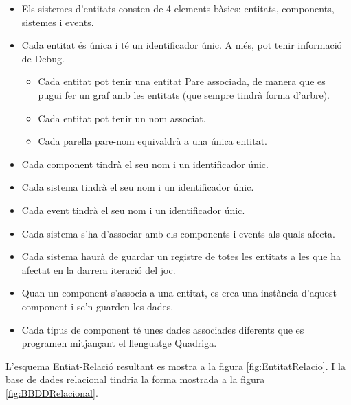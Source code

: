   \begin{itemize}
    \item Els sistemes d'entitats consten de 4 elements bàsics: entitats, components, sistemes i events.
    
    \item Cada entitat és única i té un identificador únic. A més, pot tenir informació de Debug.
      \begin{itemize}
        \item Cada entitat pot tenir una entitat Pare associada, de manera que es pugui fer un graf amb les entitats (que sempre tindrà forma d'arbre).
        \item Cada entitat pot tenir un nom associat.
        \item Cada parella pare-nom equivaldrà a una única entitat.
      \end{itemize}
    \item Cada component tindrà el seu nom i un identificador únic.
    
    \item Cada sistema tindrà el seu nom i un identificador únic.
    
    \item Cada event tindrà el seu nom i un identificador únic.
    
    \item Cada sistema s'ha d'associar amb els components i events als quals afecta.
    
    \item Cada sistema haurà de guardar un registre de totes les entitats a les que ha afectat en la darrera iteració del joc.
    
    \item Quan un component s'associa a una entitat, es crea una instància d'aquest component i se'n guarden les dades.
    
    \item Cada tipus de component té unes dades associades diferents que es programen mitjançant el llenguatge Quadriga.
  \end{itemize}

  L'esquema Entiat-Relació resultant es mostra a la figura \ref{fig:EntitatRelacio}. I la base de dades relacional tindria la forma mostrada a la figura \ref{fig:BBDDRelacional}.

